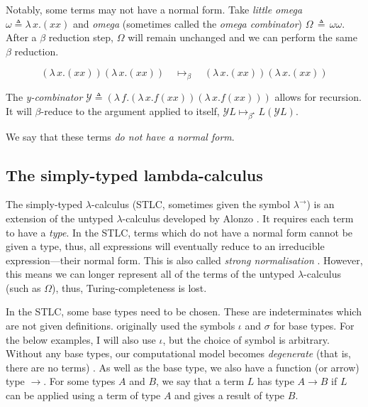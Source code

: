 Notably, some terms may not have a normal form. Take \textit{little omega} $\omega \triangleq
\lambda \, x. (x x)$ and \textit{omega} (sometimes called the \textit{omega combinator}) $\Omega \,
\triangleq \, \omega \omega$. After a $\beta$ reduction step, $\Omega$ will remain unchanged and we
can perform the same $\beta$ reduction.

\begin{equation*}
  (\lambda \, x. (x x)) (\lambda \, x. (x x)) \quad
  \mapsto_{\beta} \quad (\lambda \, x. (x x)) (\lambda \, x. (x x))
\end{equation*}

The \textit{y-combinator} $\mathcal{Y} \triangleq (\lambda \, f. (\lambda \, x. f (x x )) (\lambda
\, x. f (xx)))$ allows for recursion. It will $\beta$-reduce to the argument applied to itself,
$\mathcal{Y} L \mapsto_{\beta^{\star}} L (\mathcal{Y} L)$.

We say that these terms \textit{do not have a normal form}.

\subsection{The simply-typed lambda-calculus}
The simply-typed $\lambda$-calculus (STLC, sometimes given the symbol $\lambda^{\rightarrow}$) is an
extension of the untyped $\lambda$-calculus developed by Alonzo \citet{church_formulation_1940}. It
requires each term to have a \textit{type}. In the STLC, terms which do not have a normal form
cannot be given a type, thus, all expressions will eventually reduce to an irreducible
expression---their normal form. This is also called \textit{strong normalisation}
\citep{pierce_types_2002}. However, this means we can longer represent all of the terms of the
untyped $\lambda$-calculus (such as $\Omega$), thus, Turing-completeness is lost.

In the STLC, some base types need to be chosen. These are indeterminates which are not given
definitions. \citet{church_formulation_1940} originally used the symbols $\iota$ and $\sigma$ for
base types. For the below examples, I will also use $\iota$, but the choice of symbol
is arbitrary. Without any base types, our computational model becomes \textit{degenerate} (that is,
there are no terms) \citep{pierce_types_2002}. As well as the base type, we also have a function (or
arrow) type $\to$. For some types $A$ and $B$, we say that a term $L$ has type $A \to B$ if $L$ can be applied using a term of type $A$ and gives a result of type $B$.

